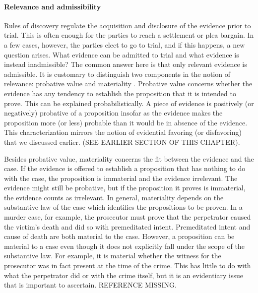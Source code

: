 \documentclass[10pt]{article}
\begin{document}



\paragraph{Relevance and admissibility}


Rules of discovery regulate the acquisition and disclosure 
of the evidence prior to trial. This is often enough for the parties to reach 
a settlement or plea bargain. In a few cases, however, the parties elect to go to trial, and 
if this happens, a new question arises. What evidence can be admitted to trial and what evidence is instead inadmissible? 
The common answer here is that only relevant evidence is admissible.
It is customary to distinguish two components in the notion of relevance: probative value and materiality
 \citep{Fisher2008Evidence, Mendez2008}. Probative value concerns whether the evidence has any tendency to establish the proposition that it is intended to prove. This can be explained probabilistically. A piece of evidence is positively (or negatively) probative of a proposition insofar as the evidence makes the proposition more (or less) probable than it would be in absence of the evidence. This characterization mirrors the notion 
of evidential favoring (or disfavoring) that we discussed earlier. (SEE EARLIER SECTION OF THIS CHAPTER). 

Besides probative value, materiality concerns the fit between the evidence and the case. If the evidence is offered to establish a proposition that has nothing to do with the case, the proposition is immaterial and the evidence irrelevant. The evidence might still be probative, 
but if the proposition it proves is immaterial, the evidence counts as irrelevant. In general, materiality depends on the substantive law of the case which identifies the propositions to be proven. In a murder case, for example, the prosecutor must prove that the perpetrator caused the 
victim's death and did so with premeditated intent. Premeditated intent and cause of death are both material to the case. 
However, a proposition can be material to a case even though it does not explicitly fall under 
the scope of the substantive law. For example, it is material whether the witness for the prosecutor was in fact present at the time of the crime. This has little to do with what the perpetrator did or with the crime itself, but it is an evidentiary issue that is important to ascertain.  
REFERENCE MISSING.  
\end{document}
